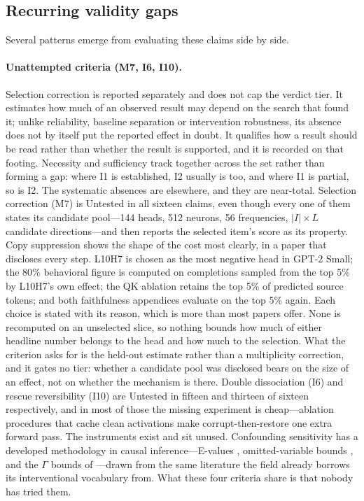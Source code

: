 \documentclass{article}
\begin{document}
\subsection{Recurring validity gaps}

Several patterns emerge from evaluating these claims side by side.

\paragraph{Unattempted criteria (M7, I6, I10).}  Selection correction is reported
separately and does not cap the verdict tier.  It estimates how much of an
observed result may depend on the search that found it; unlike reliability,
baseline separation or intervention robustness, its absence does not by itself
put the reported effect in doubt.  It qualifies how a result should be read
rather than whether the result is supported, and it is recorded on that footing.
 Necessity and sufficiency track together across the set rather than forming a gap: where I1 is established, I2 usually is too, and where I1 is partial, so is I2. The systematic absences are elsewhere, and they are near-total. Selection correction (M7) is Untested in all sixteen claims, even though every one of them states its candidate pool---144 heads, 512 neurons, 56 frequencies, $|I| \times L$ candidate directions---and then reports the selected item's score as its property. Copy suppression shows the shape of the cost most clearly, in a paper that discloses every step. L10H7 is chosen as the most negative head in GPT-2 Small; the 80\% behavioral figure is computed on completions sampled from the top 5\% by L10H7's own effect; the QK ablation retains the top 5\% of predicted source tokens; and both faithfulness appendices evaluate on the top 5\% again. Each choice is stated with its reason, which is more than most papers offer. None is recomputed on an unselected slice, so nothing bounds how much of either headline number belongs to the head and how much to the selection. What the criterion asks for is the held-out estimate rather than a multiplicity correction, and it gates no tier: whether a candidate pool was disclosed bears on the size of an effect, not on whether the mechanism is there. Double dissociation (I6) and rescue reversibility (I10) are Untested in fifteen and thirteen of sixteen respectively, and in most of those the missing experiment is cheap---ablation procedures that cache clean activations make corrupt-then-restore one extra forward pass. The instruments exist and sit unused. Confounding sensitivity has a developed methodology in causal inference---E-values \citep{vanderweele2017sensitivity}, omitted-variable bounds \citep{cinelli2020making}, and the $\Gamma$ bounds of \citet{rosenbaum2002observational}---drawn from the same literature the field already borrows its interventional vocabulary from. What these four criteria share is that nobody has tried them.
\end{document}
